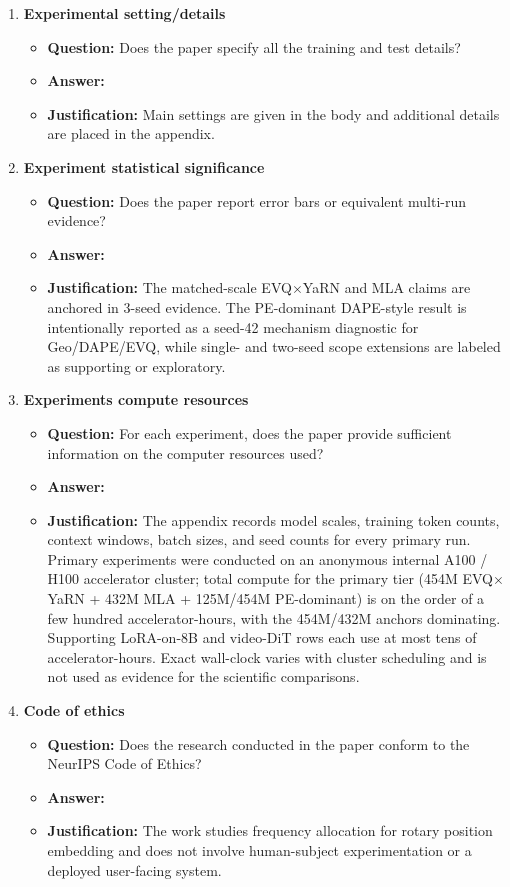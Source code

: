 \documentclass{article}
\begin{document}
\begin{enumerate}
\item \textbf{Experimental setting/details}
\begin{itemize}
\item \textbf{Question:} Does the paper specify all the training and test details?
\item \textbf{Answer:} \answerYes{}
\item \textbf{Justification:} Main settings are given in the body and additional details are placed in the appendix.
\end{itemize}

\item \textbf{Experiment statistical significance}
\begin{itemize}
\item \textbf{Question:} Does the paper report error bars or equivalent multi-run evidence?
\item \textbf{Answer:} \answerYes{}
\item \textbf{Justification:} The matched-scale EVQ$\times$YaRN and MLA claims are anchored in 3-seed evidence. The PE-dominant DAPE-style result is intentionally reported as a seed-42 mechanism diagnostic for Geo/DAPE/EVQ, while single- and two-seed scope extensions are labeled as supporting or exploratory.
\end{itemize}

\item \textbf{Experiments compute resources}
\begin{itemize}
\item \textbf{Question:} For each experiment, does the paper provide sufficient information on the computer resources used?
\item \textbf{Answer:} \answerYes{}
\item \textbf{Justification:} The appendix records model scales, training token counts, context windows, batch sizes, and seed counts for every primary run. Primary experiments were conducted on an anonymous internal A100 / H100 accelerator cluster; total compute for the primary tier (454M EVQ$\times$YaRN + 432M MLA + 125M/454M PE-dominant) is on the order of a few hundred accelerator-hours, with the 454M/432M anchors dominating. Supporting LoRA-on-8B and video-DiT rows each use at most tens of accelerator-hours. Exact wall-clock varies with cluster scheduling and is not used as evidence for the scientific comparisons.
\end{itemize}

\item \textbf{Code of ethics}
\begin{itemize}
\item \textbf{Question:} Does the research conducted in the paper conform to the NeurIPS Code of Ethics?
\item \textbf{Answer:} \answerYes{}
\item \textbf{Justification:} The work studies frequency allocation for rotary position embedding and does not involve human-subject experimentation or a deployed user-facing system.
\end{itemize}


\end{enumerate}
\end{document}
